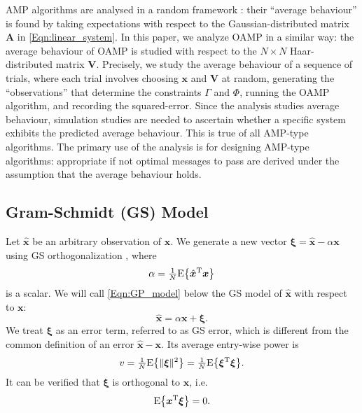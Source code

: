 \documentclass[journal]{IEEEtran}
\newcommand{\mr}{\mathrm}
\newcommand{\BE}{\begin{equation}}
\newcommand{\EE}{\end{equation}}
\renewcommand{\bf}{\bm}
\newcommand{\JMC}[1]{\textcolor{magenta}{#1}}
\begin{document}

AMP algorithms are analysed in a random framework \cite{Bayati2011}: their ``average behaviour'' is found by taking expectations with respect to the Gaussian-distributed matrix $\bf{A}$ in \eqref{Eqn:linear_system}. In this paper, we analyze OAMP in a similar way: the average behaviour of OAMP is studied with respect to the $N \times N$ Haar-distributed matrix $\bf{V}$. Precisely, we study the average behaviour of a sequence of trials, where each trial involves choosing $\bf{x}$ and $\bf{V}$ at random, generating the ``observations'' that determine the constraints $\Gamma$ and $\Phi$, running the OAMP algorithm, and recording the squared-error. Since the analysis studies average behaviour, simulation studies are needed to ascertain whether a specific system exhibits the predicted average behaviour. This is true of all AMP-type algorithms. The primary use of the analysis is for designing AMP-type algorithms: appropriate if not optimal messages to pass are derived under the assumption that the average behaviour holds.


  

\subsection{Gram-Schmidt (GS) Model}\label{Sec:SGM}
Let $\hat{\bf{x}}$ be an arbitrary observation of $\bf{x}$. We  generate a new vector $\bf{\xi} = \hat{\bf{x}} -\alpha \bf{x}$ using GS orthogonalization \cite{Schmidt1908}, where 
\BE\label{Eqn:GP_modelb}
\alpha= \tfrac{1}{N}\mr{E}\big\{\hat{\bf{x}}^{\rm T}{\bf{x}}\big\}
\EE
 is a scalar. We will call \eqref{Eqn:GP_model} below the GS model of $ \hat{\bf{x}}$ with respect to $\bf{x}$:
\BE\label{Eqn:GP_model}
 \hat{\bf{x}} = \alpha \bf{x} + \bf{\xi}.
\EE 
We treat $\bf{\xi}$ as an error term, referred to as GS error, which is different from the common definition of an error $\hat{\bf{x}}-\bf{x}$. Its average entry-wise power is
\BE\label{Eqn:GS_v}
v=  \tfrac{1}{N}\mr{E}\big\{\|\bf{\xi}\|^2\big\}=\tfrac{1}{N}\mr{E}\big\{\bf{\xi}^{\rm T}\bf{\xi} \big\}.
\EE 
 It can be verified that $\bf{\xi}$ is orthogonal to $\bf{x}$, i.e.
\BE\label{Eqn:GP_modelc}
    \mr{E}\big\{\bf{x}^{\rm T} \bf{\xi}\big\} = 0.
\EE

\end{document}

